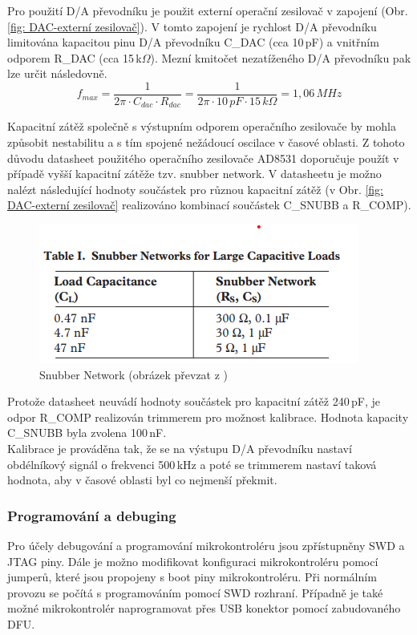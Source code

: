     Pro použití D/A převodníku je použit externí operační zesilovač v zapojení (Obr. \ref{fig: DAC-externí zesilovač}).
    V tomto zapojení je rychlost D/A převodníku limitována kapacitou pinu D/A převodníku C\_DAC (cca 10\,pF)
    a vnitřním odporem R\_DAC (cca 15\,k$\Omega$). Mezní kmitočet nezatíženého D/A převodníku pak lze určit následovně.
    \begin{equation}
        f_{max} = \frac{1}{2\pi \cdot  C_{dac} \cdot  R_{dac}} = \frac{1}{2\pi \cdot 10\,pF \cdot 15\,k\Omega} = 1,06\,MHz
    \end{equation}

    Kapacitní zátěž společně s výstupním odporem operačního zesilovače by mohla
    způsobit nestabilitu a s tím spojené nežádoucí oscilace v časové oblasti.
    Z tohoto důvodu datasheet použitého operačního zesilovače AD8531 doporučuje použít v případě vyšší kapacitní zátěže tzv. snubber network.
    V datasheetu je možno nalézt následující hodnoty součástek pro různou kapacitní zátěž (v Obr. \ref{fig: DAC-externí zesilovač} realizováno
    kombinací součástek C\_SNUBB a R\_COMP).
    \begin{figure}[ht!]
        \centering
        \includegraphics[]{obrazky/snubber_values.png}
        \caption{Snubber Network (obrázek převzat z \cite{OPA_datasheet})}
        \label{fig: Snubber Network}
    \end{figure}

    Protože datasheet neuvádí hodnoty součástek pro kapacitní zátěž 240\,pF, je odpor R\_COMP realizován
    trimmerem pro možnost kalibrace. Hodnota kapacity C\_SNUBB byla zvolena 100\,nF.\\
    Kalibrace je prováděna tak, že se na výstupu D/A převodníku nastaví obdélníkový
    signál o frekvenci 500\,kHz a poté se trimmerem nastaví taková hodnota, aby v časové oblasti
    byl co nejmenší překmit\cite{DAC_stability,OPA_stability}.\\

    \subsubsection{Programování a debuging}
    Pro účely debugování a programování mikrokontroléru jsou zpřístupněny SWD a JTAG piny.
    Dále je možno modifikovat konfiguraci mikrokontroléru pomocí jumperů, které jsou propojeny
    s boot piny mikrokontroléru. Při normálním provozu se počítá s programováním pomocí SWD rozhraní.
    Případně je také možné mikrokontrolér naprogramovat přes USB konektor pomocí zabudovaného DFU.

